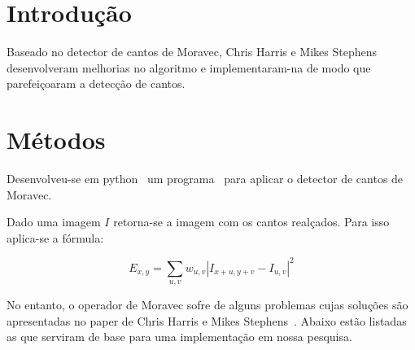 \documentclass[10pt,a4paper]{article}
\begin{document}
\vspace{2mm}
\newpage

\section{Introdução}

Baseado no detector de cantos de Moravec, Chris Harris e
Mikes Stephens~\cite{paper} desenvolveram melhorias no algoritmo e
implementaram-na de modo que parefeiçoaram a detecção de cantos.

\section{Métodos}

Desenvolveu-se em python~\cite{python} um programa~\cite{code} para aplicar o
detector de cantos de Moravec.

Dado uma imagem $I$ retorna-se a imagem com os cantos realçados.
Para isso aplica-se a fórmula:

\begin{equation}
E_{x,y}=\sum_{u,v}w_{u,v}\left | I_{x+u,y+v}-I_{u,v}  \right |^2
\end{equation}

No entanto, o operador de Moravec sofre de alguns problemas cujas soluções são apresentadas no paper de  Chris Harris e
Mikes Stephens~\cite{paper}. Abaixo estão listadas as que serviram de
base para uma implementação  em
nossa pesquisa. 
\end{document}
